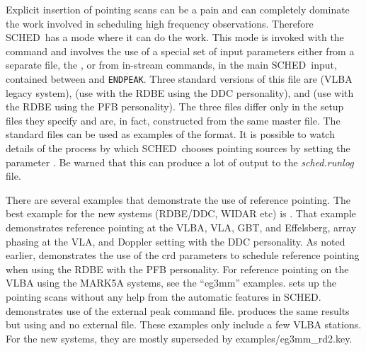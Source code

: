 \documentclass{report}
\newcommand{\sched}{{\sc SCHED}}
\newcommand{\schedb}{{\sc SCHED~}}
\begin{document}
Explicit insertion of pointing scans can be a pain and can completely
dominate the work involved in scheduling high frequency observations.
Therefore \schedb has a mode where it can do the work.  This mode is
invoked with the  command and
involves the use of a special set of input parameters either from a
separate file, the , or from
in-stream commands, in the main \schedb input, contained between
 and {\tt ENDPEAK}.  Three
standard versions of this file are  (VLBA legacy system),
 (use with the RDBE
using the DDC personality), and  (use with the RDBE
using the PFB personality).  The three files differ only in the setup
files they specify and are, in fact, constructed from the same master
file.  The standard files can be used as examples of the format.  It
is possible to watch details of the process by which \schedb chooses
pointing sources by setting the parameter .  Be warned that this can produce a lot of
output to the {\sl sched.runlog} file.

There are several examples that demonstrate the use of reference
pointing.  The best example for the new systems (RDBE/DDC, WIDAR etc)
is .  That
example demonstrates reference pointing at the VLBA, VLA, GBT, and
Effelsberg, array phasing at the VLA, and Doppler setting with the DDC
personality.  As noted earlier,  demonstrates the use of the
crd parameters to schedule reference pointing when using the RDBE with
the PFB personality.  For reference pointing on the VLBA using the
MARK5A systems, see the ``eg3mm'' examples.   sets up the pointing scans without
any help from the automatic features in \sched.
 demonstrates
use of the external peak command file.   produces the same results but using
 and no external file.  These
examples only include a few VLBA stations.  For the new systems, they
are mostly superseded by 
{examples/eg3mm\_rd2.key}.
\end{document}

